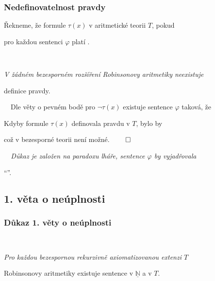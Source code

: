     \subsubsection*{Nedefinovatelnost pravdy}
    
    Řekneme, že formule $\tau(x)$  v aritmetické teorii $T$, pokud
    \smallskip
    
    pro každou sentenci $\varphi$ platí .
    \medskip
    
    \smallskip
    
    {\bf {}}\ \ {\it V žádném bezesporném rozšíření Robinsonovy aritmetiky neexistuje
    \smallskip
    
    definice pravdy.}
    \medskip
    
    \ \ Dle věty o pevném bodě pro $\neg\tau(x)$ existuje sentence $\varphi$ taková, že
    
    
    
    Kdyby formule $\tau(x)$ definovala pravdu v $T$, bylo by
    
    
    
    což v bezesporné teorii není možné. $\qed$
    \medskip
    
    \smallskip
    
    {\it {}\ \ Důkaz je založen na paradoxu lháře, sentence $\varphi$ by vyjadřovala
    \smallskip
    
    ``''.}
    
    
    
    \subsection{1. věta o neúplnosti}
    \subsubsection*{Důkaz 1. věty o neúplnosti}
    \ \ {\it Pro každou bezespornou rekurzivně axiomatizovanou extenzi $T$
    
    
    Robinsonovy aritmetiky existuje sentence  v $\underline{\mathbb{N}}$ a  v $T$.}
    \medskip
    
